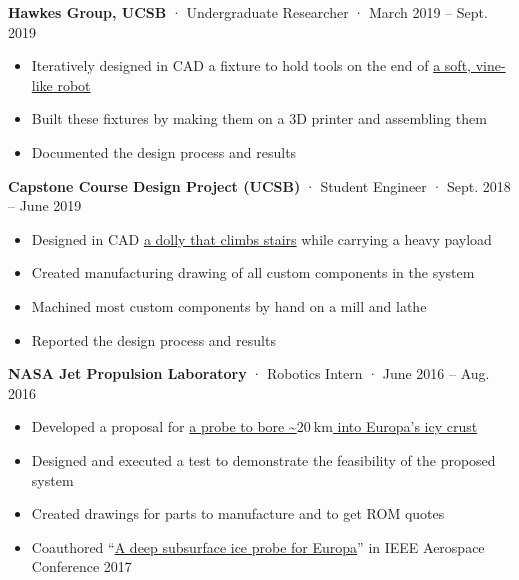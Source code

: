 \documentclass[12pt, oneside]{article}
\newcommand{\jobtitle}[3] {
	{\bf #1} · {#2} · {#3} \vspace{-7pt} \\
}
\begin{document}
\begin{flushleft}
\jobtitle{Hawkes Group, UCSB}{Undergraduate Researcher}{March 2019 – Sept. 2019}
\begin{itemize}
	\item Iteratively designed in CAD a fixture to hold tools on the end of \href{https://portfolium.com/entry/vine-robot-tool-mount}{a soft, vine-like robot} \\
	\item Built these fixtures by making them on a 3D printer and assembling them \\
	\item Documented the design process and results \\
\end{itemize}

\jobtitle{Capstone Course Design Project (UCSB)}{Student Engineer}{Sept. 2018 – June 2019}
\begin{itemize}
	\item Designed in CAD \href{https://portfolium.com/entry/automatic-stair-climbing-vehicle}{a dolly that climbs stairs} while carrying a heavy payload \\
	\item Created manufacturing drawing of all custom components in the system \\
	\item Machined most custom components by hand on a mill and lathe \\
	\item Reported the design process and results \\
\end{itemize}

\jobtitle{NASA Jet Propulsion Laboratory}{Robotics Intern}{June 2016 – Aug. 2016}
\begin{itemize}
	\item Developed a proposal for \href{https://portfolium.com/entry/owms-deep-subsurface-access-level-wind}{a probe to bore \textasciitilde$\SI{20}{\kilo\meter}$ into Europa's icy crust} \\
	\item Designed and executed a test to demonstrate the feasibility of the proposed system \\
	\item Created drawings for parts to manufacture and to get ROM quotes \\
	\item Coauthored ``\href{https://ieeexplore-ieee-org.proxy.library.ucsb.edu:9443/stamp/stamp.jsp?tp=&arnumber=7943863}{A deep subsurface ice probe for Europa}'' in IEEE Aerospace Conference 2017 \\
\end{itemize}


\end{flushleft}
\end{document}
